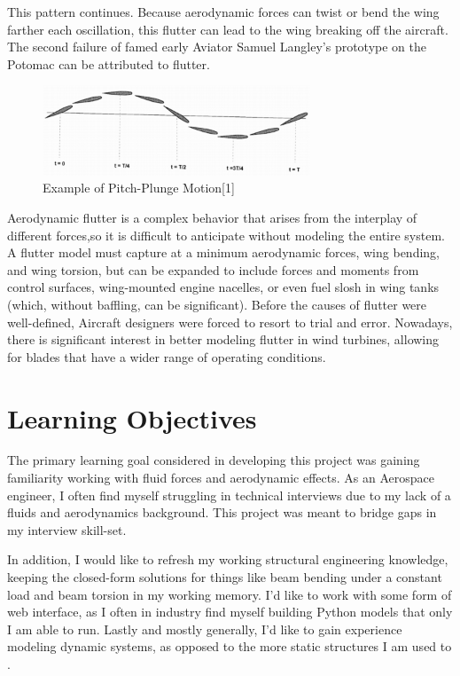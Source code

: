 \documentclass[]{article}
\begin{document}
This pattern continues. Because aerodynamic forces can twist or bend the wing farther each oscillation, this flutter can lead to the wing breaking off the aircraft. The second failure of famed early Aviator Samuel Langley's prototype on the Potomac can be attributed to flutter. \cite{article}

\begin{figure}[H]
	\includegraphics[width=8cm]{PitchPlunge}
	\centering
	\caption{Example of Pitch-Plunge Motion[1]}
\end{figure}


Aerodynamic flutter is a complex behavior that arises from the interplay of different forces,so it is difficult to anticipate without modeling the entire system. A flutter model must capture at a minimum aerodynamic forces, wing bending, and wing torsion, but can be expanded to include forces and moments from control surfaces, wing-mounted engine nacelles, or even fuel slosh in wing tanks (which, without baffling, can be significant). Before the causes of flutter were well-defined, Aircraft designers were forced to resort to trial and error. Nowadays, there is significant interest in better modeling flutter in wind turbines, allowing for blades that have a wider range of operating conditions. 

\section{Learning Objectives}

The primary learning goal considered in developing this project was gaining familiarity working with fluid forces and aerodynamic effects. As an Aerospace engineer, I often find myself struggling in technical interviews due to my lack of a fluids and aerodynamics background. This project was meant to bridge gaps in my interview skill-set.

In addition, I would like to refresh my working structural engineering knowledge, keeping the closed-form solutions for things like beam bending under a constant load and beam torsion in my working memory. I'd like to work with some form of web interface, as I often in industry find myself building Python models that only I am able to run. Lastly and mostly generally, I'd like to gain experience modeling dynamic systems, as opposed to the more static structures I am used to .
\end{document}
